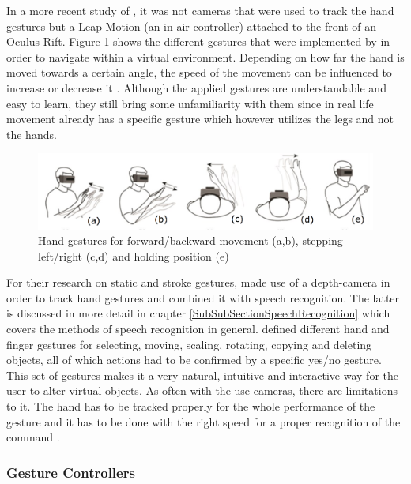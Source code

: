 In a more recent study of \cite{Khundam2015}, it was not cameras that were used to track the hand gestures but a Leap Motion (an in-air controller) attached to the front of an Oculus Rift. Figure \ref{fig:leapmotion} shows the different gestures that were implemented by \cite{Khundam2015} in order to navigate within a virtual environment. Depending on how far the hand is moved towards a certain angle, the speed of the movement can be influenced to increase or decrease it \citep{Khundam2015}. Although the applied gestures are understandable and easy to learn, they still bring some unfamiliarity with them since in real life movement already has a specific gesture which however utilizes the legs and not the hands.
\begin{figure}[h]
	\begin{center}
		\includegraphics[width=14cm]{03_Figures/05_LitReview/Khundam2015_LeapMotion.png}
		\caption[Hand gestures for forward/backward movement, stepping left/right and holding position]{Hand gestures for forward/backward movement (a,b), stepping left/right (c,d) and holding position (e) \citep{Khundam2015}}
		\label{fig:leapmotion}
	\end{center}
\end{figure}
\newline
For their research on static and stroke gestures, \cite{Chun2015} made use of a depth-camera in order to track hand gestures and combined it with speech recognition. The latter is discussed in more detail in chapter \ref{SubSubSectionSpeechRecognition} which covers the methods of speech recognition in general. \cite{Chun2015} defined different hand and finger gestures for selecting, moving, scaling, rotating, copying and deleting objects, all of which actions had to be confirmed by a specific yes/no gesture. This set of gestures makes it a very natural, intuitive and interactive way for the user to alter virtual objects. As often with the use cameras, there are limitations to it. The hand has to be tracked properly for the whole performance of the gesture and it has to be done with the right speed for a proper recognition of the command \citep{Chun2015}.


\subsubsection{Gesture Controllers}

